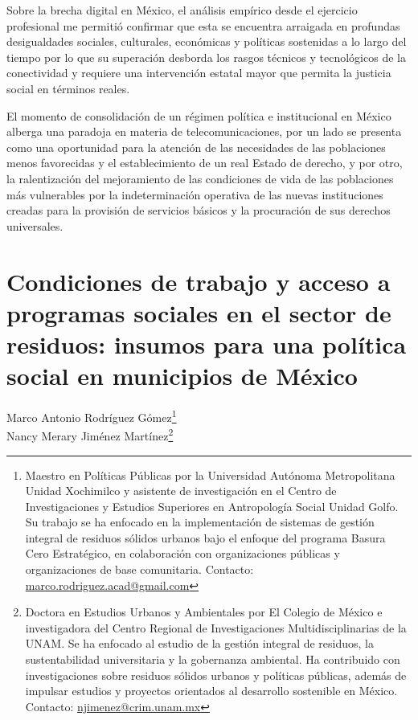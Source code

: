 \documentclass[
  spanish,
  11pt,
  a4paper,
]{scrbook}
\begin{document}
Sobre la brecha digital en México, el análisis empírico desde el
ejercicio profesional me permitió confirmar que esta se encuentra
arraigada en profundas desigualdades sociales, culturales, económicas y
políticas sostenidas a lo largo del tiempo por lo que su superación
desborda los rasgos técnicos y tecnológicos de la conectividad y
requiere una intervención estatal mayor que permita la justicia social
en términos reales.

El momento de consolidación de un régimen política e institucional en
México alberga una paradoja en materia de telecomunicaciones, por un
lado se presenta como una oportunidad para la atención de las
necesidades de las poblaciones menos favorecidas y el establecimiento de
un real Estado de derecho, y por otro, la ralentización del mejoramiento
de las condiciones de vida de las poblaciones más vulnerables por la
indeterminación operativa de las nuevas instituciones creadas para la
provisión de servicios básicos y la procuración de sus derechos
universales.

\printbibliography[heading=subbibliography, title={Referencias Bibliográficas}]


\chapter{Condiciones de trabajo y acceso a programas sociales en el
sector de residuos: insumos para una política social en municipios de
México}\label{condiciones-de-trabajo-y-acceso-a-programas-sociales-en-el-sector-de-residuos-insumos-para-una-poluxedtica-social-en-municipios-de-muxe9xico}

\begin{flushright}
\Large Marco Antonio Rodríguez Gómez\footnote{Maestro en Políticas Públicas por la Universidad Autónoma Metropolitana Unidad Xochimilco y asistente de investigación en el Centro de Investigaciones y Estudios Superiores en Antropología Social Unidad Golfo. Su trabajo se ha enfocado en la implementación de sistemas de gestión integral de residuos sólidos urbanos bajo el enfoque del programa Basura Cero Estratégico, en colaboración con organizaciones públicas y organizaciones de base comunitaria. Contacto: \href{marco.rodriguez.acad@gmail.com}{marco.rodriguez.acad@gmail.com}} \\ Nancy Merary Jiménez Martínez\footnote{Doctora en Estudios Urbanos y Ambientales por El Colegio de México e investigadora del Centro Regional de Investigaciones Multidisciplinarias de la UNAM. Se ha enfocado al estudio de la gestión integral de residuos, la sustentabilidad universitaria y la gobernanza ambiental. Ha contribuido con investigaciones sobre residuos sólidos urbanos y políticas públicas, además de impulsar estudios y proyectos orientados al desarrollo sostenible en México. Contacto: \href{njimenez@crim.unam.mx}{njimenez@crim.unam.mx}}
\end{flushright}
\end{document}
